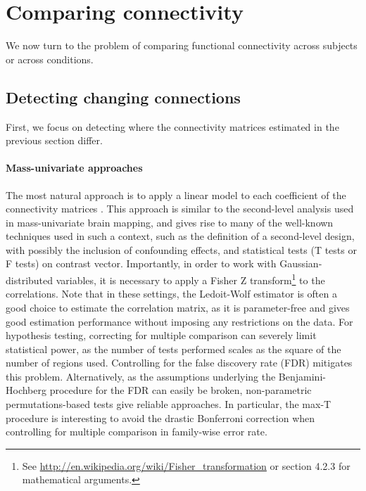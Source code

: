 \documentclass[5p]{elsarticle}
\begin{document}




\section{Comparing connectivity}

We now turn to the problem of comparing functional
connectivity across subjects or across conditions.

\subsection{Detecting changing connections}

First, we focus on detecting where the connectivity matrices estimated in
the previous section differ.

\paragraph{Mass-univariate approaches}
%
The most natural approach is to apply a linear model to each coefficient of
the connectivity matrices \cite{lewis2009,grillon2012}. This
approach is similar to the second-level analysis used in mass-univariate
brain mapping, and gives rise to many of the well-known techniques
used in such a context, such as the definition of a second-level design,
with possibly the inclusion of confounding effects, and statistical tests
(T tests or F tests) on contrast vector. Importantly, in order to work
with Gaussian-distributed variables, it is necessary to apply a Fisher
Z transform\footnote{See
\url{http://en.wikipedia.org/wiki/Fisher_transformation} or
\cite{anderson1958} section 4.2.3 for mathematical arguments.} to the
correlations. Note that
in these settings, the Ledoit-Wolf estimator \cite{ledoit2004} is
often a good choice to estimate the correlation matrix, as it is
parameter-free and gives good estimation performance without imposing any
restrictions on the data.
%
For hypothesis testing,
correcting for multiple comparison can severely limit statistical
power, as the number of tests performed scales as the square of the
number of regions used. Controlling for the false discovery rate (FDR)
mitigates this problem. Alternatively, as the assumptions underlying the
Benjamini-Hochberg procedure \cite{benjamini1995} for the FDR can easily
be broken, non-parametric permutations-based tests give reliable
approaches. In particular, the max-T procedure \cite{ge2003,nichols2001}
is interesting to avoid the drastic Bonferroni correction when
controlling for multiple comparison in family-wise error rate.
\end{document}
